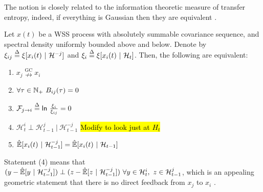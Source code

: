\documentclass[12pt]{article}
\def\ngc{\overset{\text{GC}}{\nrightarrow}}  %
\def\H{\mathcal{H}}  %
\newcommand{\linE}[2]{\hat{\E}[#1\ |\ #2]}  %
\newcommand{\linEerr}[2]{\xi[#1\ |\ #2]}  %
\begin{document}
The notion is closely related to the information theoretic measure of
transfer entropy, indeed, if everything is Gaussian then they are
equivalent \cite{barnett2009granger}.

\begin{theorem}
  \label{thm:granger_causality_equivalences}
  Let $x(t)$ be a WSS process with absolutely summable covariance
  sequence, and spectral density uniformly bounded above and below.  Denote by
  $\xi_{ij} \defeq \linEerr{x_i(t)}{\H^{-j}}$ and
  $\xi_i \defeq \linEerr{x_i(t)}{\H_t}$.  Then, the following are equivalent:

  \begin{enumerate}
    \item{$x_j \ngc x_i$}
    \item{$\forall \tau \in \N_+\ B_{ij}(\tau) = 0$}
    \item{$\mathcal{F}_{j \rightarrow i} \overset{\Delta}{=} \mathsf{ln\ }\frac{\xi_i}{\xi_{ij}} = 0$}
    \item{$\H_t^{i} \perp \H_{t - 1}^{j}\ |\ \H_{t - 1}^{-j}$ \hl{Modify to look just at $H_t$}}
    \item{$\linE{x_i(t)}{\H_{t - 1}^{-j}} = \linE{x_i(t)}{\H_{t - 1}}$}
  \end{enumerate}
\end{theorem}

Statement (4) means that
$(y - \linE{y}{\H_{t - 1}^{-j}}) \perp (z - \linE{z}{\H_{t -
    1}^{-j}})\ \forall y \in \H_t^i,\ z \in \H_{t - 1}^j$, which is an
appealing geometric statement that there is no direct feedback from
$x_j$ to $x_i$ \cite{lindquist}.
\end{document}
